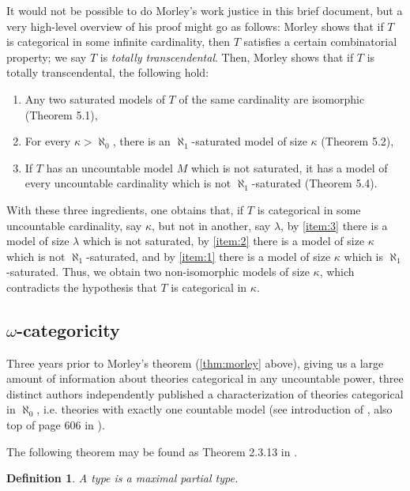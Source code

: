 \documentclass{article}
\newtheorem{definition}[theorem]{Definition}
\theoremstyle{nonumberplain}
\begin{document}
It would not be possible to do Morley's work justice in this brief document, but a very high-level overview of his proof might go as follows: Morley shows that if $T$ is categorical in some infinite cardinality, then $T$ satisfies a certain combinatorial property; we say $T$ is \emph{totally transcendental}. Then, Morley shows that if $T$ is totally transcendental, the following hold:
\begin{enumerate}
\item\label{item:3} Any two saturated models of $T$ of the same cardinality are isomorphic (Theorem 5.1),
\item\label{item:1} For every $\kappa > \aleph_0$, there is an $\aleph_1$-saturated model of size $\kappa$ (Theorem 5.2),
\item	\label{item:2} If $T$ has an uncountable model $M$ which is not saturated, it has a model of every uncountable cardinality which is not $\aleph_1$-saturated (Theorem 5.4).
\end{enumerate}

With these three ingredients, one obtains that, if $T$ is categorical in some uncountable cardinality, say $\kappa$, but not in another, say $\lambda$, by \ref{item:3} there is a model of size $\lambda$ which is not saturated, by \ref{item:2} there is a model of size $\kappa$ which is not $\aleph_1$-saturated, and by \ref{item:1} there is a model of size $\kappa$ which is $\aleph_1$-saturated. Thus, we obtain two non-isomorphic models of size $\kappa$, which contradicts the hypothesis that $T$ is categorical in $\kappa$.

\subsection{$\omega$-categoricity}\label{sec:omega}

Three years prior to Morley's theorem (\ref{thm:morley} above), giving us a large amount of information about theories categorical in any uncountable power, three distinct authors independently published a characterization of theories categorical in $\aleph_0$, i.e. theories with exactly one countable model (see introduction of \cite{primersimpletheories}, also top of page 606 in \cite{cnk}).

The following theorem may be found as Theorem 2.3.13 in \cite{cnk}.

\begin{definition}
A \emph{type} is a maximal partial type.
\end{definition}
\end{document}
